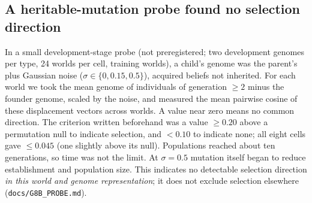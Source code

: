 \documentclass[11pt]{article}
\begin{document}
\subsection{A heritable-mutation probe found no selection direction}
In a small development-stage probe (not preregistered; two development genomes per type, 24 worlds per cell, training worlds), a child's genome was the parent's plus Gaussian noise ($\sigma\in\{0,0.15,0.5\}$), acquired beliefs not inherited. For each world we took the mean genome of individuals of generation $\ge2$ minus the founder genome, scaled by the noise, and measured the mean pairwise cosine of these displacement vectors across worlds. A value near zero means no common direction. The criterion written beforehand was a value $\ge0.20$ above a permutation null to indicate selection, and $<0.10$ to indicate none; all eight cells gave $\le0.045$ (one slightly above its null). Populations reached about ten generations, so time was not the limit. At $\sigma=0.5$ mutation itself began to reduce establishment and population size. This indicates no detectable selection direction \emph{in this world and genome representation}; it does not exclude selection elsewhere (\texttt{docs/G8B\_PROBE.md}).
\end{document}
